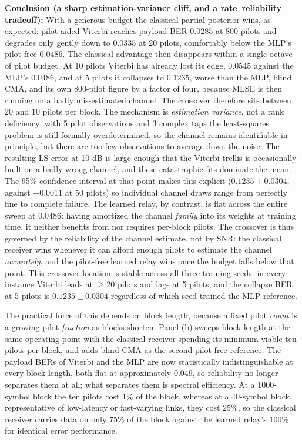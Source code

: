 \textbf{Conclusion (a sharp estimation-variance cliff, and a rate--reliability tradeoff):} With a generous budget the classical partial posterior wins, as expected: pilot-aided Viterbi reaches payload BER $0.0285$ at 800 pilots and degrades only gently down to $0.0335$ at 20 pilots, comfortably below the MLP's pilot-free $0.0486$. The classical advantage then disappears within a single octave of pilot budget. At 10 pilots Viterbi has already lost its edge, $0.0545$ against the MLP's $0.0486$, and at 5 pilots it collapses to $0.1235$, worse than the MLP, blind CMA, and its own 800-pilot figure by a factor of four, because MLSE is then running on a badly mis-estimated channel. The crossover therefore sits between 20 and 10 pilots per block. The mechanism is \emph{estimation variance}, not a rank deficiency: with 5 pilot observations and 3 complex taps the least-squares problem is still formally overdetermined, so the channel remains identifiable in principle, but there are too few observations to average down the noise. The resulting LS error at 10 dB is large enough that the Viterbi trellis is occasionally built on a badly wrong channel, and these catastrophic fits dominate the mean. The 95\% confidence interval at that point makes this explicit ($0.1235 \pm 0.0304$, against $\pm 0.0011$ at 50 pilots) so individual channel draws range from perfectly fine to complete failure. The learned relay, by contrast, is flat across the entire sweep at $0.0486$: having amortized the channel \emph{family} into its weights at training time, it neither benefits from nor requires per-block pilots. The crossover is thus governed by the reliability of the channel estimate, not by SNR: the classical receiver wins whenever it can afford enough pilots to estimate the channel \emph{accurately}, and the pilot-free learned relay wins once the budget falls below that point. This crossover location is stable across all three training seeds: in every instance Viterbi leads at $\geq 20$ pilots and lags at 5 pilots, and the collapse BER at 5 pilots is $0.1235 \pm 0.0304$ regardless of which seed trained the MLP reference.

The practical force of this depends on block length, because a fixed pilot \emph{count} is a growing pilot \emph{fraction} as blocks shorten. Panel (b) sweeps block length at the same operating point with the classical receiver spending its minimum viable ten pilots per block, and adds blind CMA as the second pilot-free reference. The payload BERs of Viterbi and the MLP are now statistically indistinguishable at every block length, both flat at approximately $0.049$, so reliability no longer separates them at all; what separates them is spectral efficiency. At a 1000-symbol block the ten pilots cost $1\%$ of the block, whereas at a 40-symbol block, representative of low-latency or fast-varying links, they cost $25\%$, so the classical receiver carries data on only $75\%$ of the block against the learned relay's $100\%$ for identical error performance.

